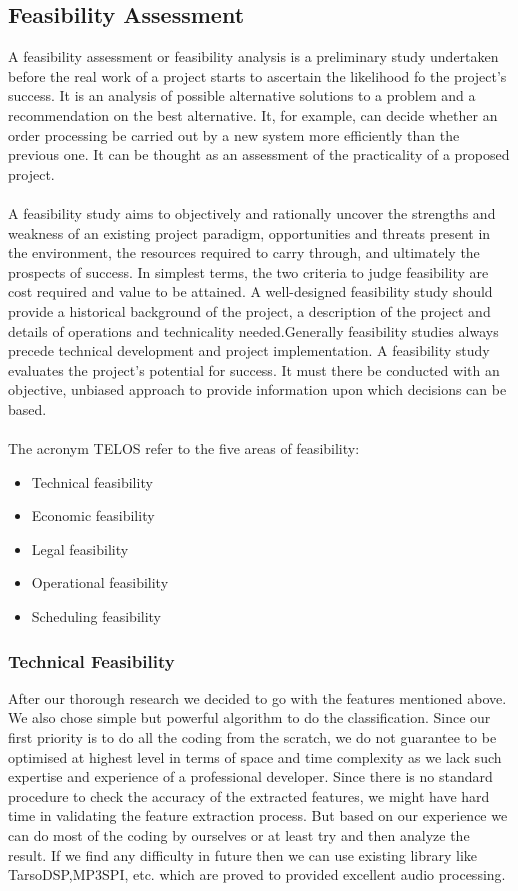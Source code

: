 \subsection{Feasibility Assessment}
A feasibility assessment or feasibility analysis is a preliminary study undertaken before the real work of a project starts to ascertain the likelihood fo the project's success.
It is an analysis of possible alternative solutions to a problem and a recommendation on the best alternative. It, for example, can decide whether an order processing be carried out by a new system more 
efficiently than the previous one. It can be thought as an assessment of the practicality of a proposed project.\\
\\
A feasibility study aims to objectively and rationally uncover the strengths and weakness of an existing project paradigm, opportunities and threats present in the environment, the resources required to carry through, and ultimately the prospects
of success. In simplest terms, the two criteria to judge feasibility are cost required and value to be attained. A well-designed feasibility study should provide a historical background of the project,
a description of the project and details of operations and technicality needed.Generally feasibility studies always precede technical development and project implementation. A feasibility study evaluates the project's potential for success. It must there be
conducted with an objective, unbiased approach to provide information upon which decisions can be based.\\
\\
The acronym TELOS refer to the five areas of feasibility:
\begin{itemize}
        \item Technical feasibility
        \item Economic feasibility
        \item Legal feasibility
        \item Operational feasibility
        \item Scheduling feasibility
\end{itemize}

\subsubsection{Technical Feasibility}
After our thorough research we decided to go with the features mentioned above. We also chose simple but powerful algorithm to do the classification.
Since our first priority is to do all the coding from the scratch, we do not guarantee to be optimised at highest level in terms of space and time complexity as we lack such expertise and experience of a professional developer.
Since there is no standard procedure to check the accuracy of the extracted features, we might have hard time in validating the feature extraction process.
But based on our experience we can do most of the coding by ourselves or at least try and then analyze the result. If we find any difficulty in future then we can use existing library like TarsoDSP,MP3SPI, etc. which are proved to provided excellent audio processing.

